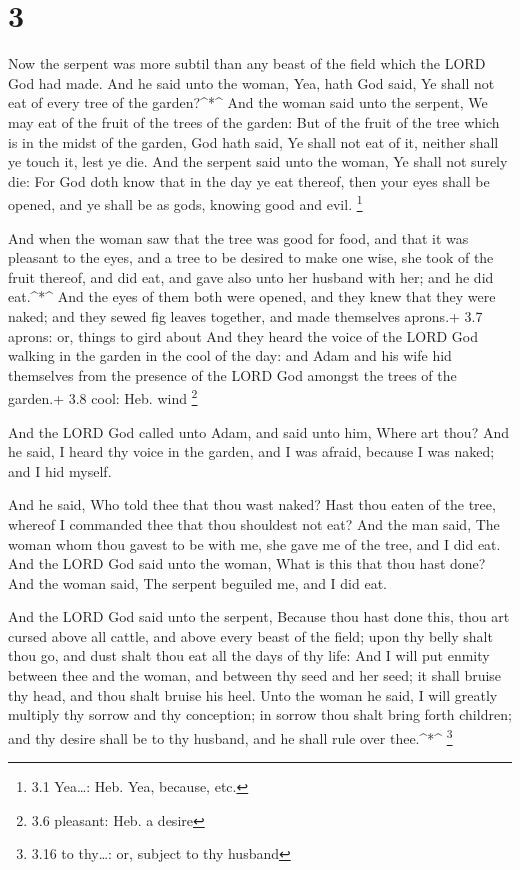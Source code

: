 \hypertarget{section-2}{%
\section{3}\label{section-2}}

 Now the serpent was more subtil than any beast of the field
which the LORD God had made. And he said unto the woman, Yea, hath God
said, Ye shall not eat of every tree of the garden?\^{}*\^{}
 And the woman said unto the serpent, We may eat of the
fruit of the trees of the garden:  But of the fruit of the
tree which is in the midst of the garden, God hath said, Ye shall not
eat of it, neither shall ye touch it, lest ye die.  And the
serpent said unto the woman, Ye shall not surely die:  For
God doth know that in the day ye eat thereof, then your eyes shall be
opened, and ye shall be as gods, knowing good and evil. \footnote{3.1
  Yea\ldots: Heb. Yea, because, etc.}

 And when the woman saw that the tree was good for food, and
that it was pleasant to the eyes, and a tree to be desired to make one
wise, she took of the fruit thereof, and did eat, and gave also unto her
husband with her; and he did eat.\^{}*\^{}  And the eyes of
them both were opened, and they knew that they were naked; and they
sewed fig leaves together, and made themselves aprons.+ 3.7 aprons: or,
things to gird about  And they heard the voice of the LORD
God walking in the garden in the cool of the day: and Adam and his wife
hid themselves from the presence of the LORD God amongst the trees of
the garden.+ 3.8 cool: Heb. wind \footnote{3.6 pleasant: Heb. a desire}

 And the LORD God called unto Adam, and said unto him, Where
art thou?  And he said, I heard thy voice in the garden,
and I was afraid, because I was naked; and I hid myself.

 And he said, Who told thee that thou wast naked? Hast thou
eaten of the tree, whereof I commanded thee that thou shouldest not eat?
 And the man said, The woman whom thou gavest to be with
me, she gave me of the tree, and I did eat.  And the LORD
God said unto the woman, What is this that thou hast done? And the woman
said, The serpent beguiled me, and I did eat.

 And the LORD God said unto the serpent, Because thou hast
done this, thou art cursed above all cattle, and above every beast of
the field; upon thy belly shalt thou go, and dust shalt thou eat all the
days of thy life:  And I will put enmity between thee and
the woman, and between thy seed and her seed; it shall bruise thy head,
and thou shalt bruise his heel.  Unto the woman he said, I
will greatly multiply thy sorrow and thy conception; in sorrow thou
shalt bring forth children; and thy desire shall be to thy husband, and
he shall rule over thee.\^{}*\^{} \footnote{3.16 to thy\ldots: or,
  subject to thy husband}

